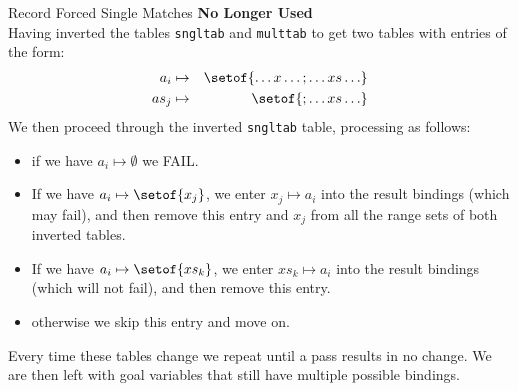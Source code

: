 Record Forced Single Matches \textbf{No Longer Used}\\
  Having inverted the tables \texttt{sngltab} and \texttt{multtab}
  to get two tables with entries of the form:
  \begin{eqnarray*}
    a_i &\mapsto& \setof{\ldots x \ldots; \ldots xs \ldots}
  \\ as_j &\mapsto& \setof{; \ldots xs \ldots}
  \end{eqnarray*}
  We then proceed through the inverted \texttt{sngltab} table,
  processing as follows:
  \begin{itemize}
    \item if we have $a_i \mapsto \emptyset$ we FAIL.
    \item If we have $a_i \mapsto \setof{x_j}$,
      we enter $x_j \mapsto a_i$ into the result bindings
      (which may fail),
      and then remove this entry
      and $x_j$ from all the range sets of both inverted
      tables.
    \item
      If we have $a_i \mapsto \setof{xs_k}$,
      we enter $xs_k \mapsto a_i$ into the result bindings
      (which will not fail),
      and then remove this entry.
    \item otherwise we skip this entry and move on.
  \end{itemize}
  Every time these tables change we repeat until a
  pass results in no change.
  We are then left with goal variables that still have
  multiple possible bindings.